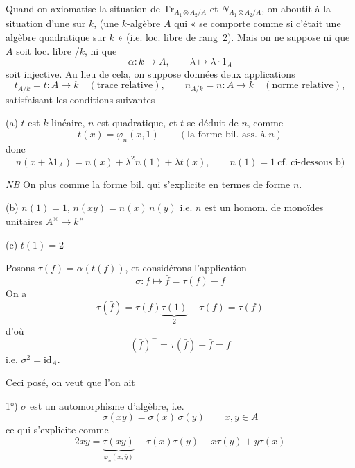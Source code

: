 \documentclass[11pt,a4paper]{article}
\begin{document}
Quand on axiomatise la situation  de $\mathrm{Tr}_{A_1 \otimes A_2 / A}$ et $N_{A_1 \otimes A_2 / A}$, on aboutit à la situation d'une \ill{} sur $k$, (une $k$-algèbre $A$ qui « se comporte comme si c'était une algèbre quadratique sur $k$ » (i.e. loc. libre de rang~2). Mais on ne suppose ni que $A$ soit loc. libre  \struck{\ill{}}/$k$, ni que
\[
  \alpha : k \to A , \qquad \lambda \mapsto \lambda \cdot 1_A
\]
soit injective. Au lieu de cela, on suppose données deux applications
\[
  t_{A/k} = t : A \to k \quad (\text{trace relative}) , \qquad
  n_{A/k} = n : A \to k \quad (\text{norme relative}) ,
\]
satisfaisant les conditions suivantes

(a) $t$ est $k$-linéaire, $n$ est quadratique, et $t$ se déduit de $n$, comme
\[
  t(x) = \varphi_n(x, 1) \qquad (\text{la forme bil. ass. à } n)
\]
donc \ill{}
\[
  n(x + \lambda 1_A) = n(x) + \lambda^2 n(1) + \lambda t(x) , \qquad n(1) = 1 \ \text{cf. ci-dessous b)}
\]

 \emph{NB} On  plus  comme la forme bil. qui s'explicite en termes de  forme $n$.

(b) \quad $n(1) = 1$, \quad $n(xy) = n(x)\, n(y)$ \quad i.e. $n$ est un homom. de monoïdes unitaires $A^{\times} \to k^{\times}$

(c) \quad $t(1) = 2$

Posons $\tau(f) = \alpha(t(f))$, et considérons l'application
\[
  \sigma : f \mapsto \bar{f} = \tau(f) - f
\]
On a
\[
  \tau(\bar{f}) = \tau(f) \underbrace{\tau(1)}_{2} - \tau(f) = \tau(f)
\]
d'où
\[
  (\bar{f})^{-} = \tau(\bar{f}) - \bar{f} = f
\]
i.e.  $\sigma^2 = \mathrm{id}_A$.

Ceci posé, on veut que l'on ait

1°) $\sigma$ est un automorphisme d'algèbre, i.e.
\[
  \sigma(xy) = \sigma(x)\, \sigma(y) \qquad x, y \in A
\]
ce qui s'explicite comme
\[
  2xy = \underbrace{\tau(xy)}_{\varphi_n(x, \bar{y})} - \tau(x)\tau(y) + x\tau(y) + y\tau(x)
\]
\end{document}
